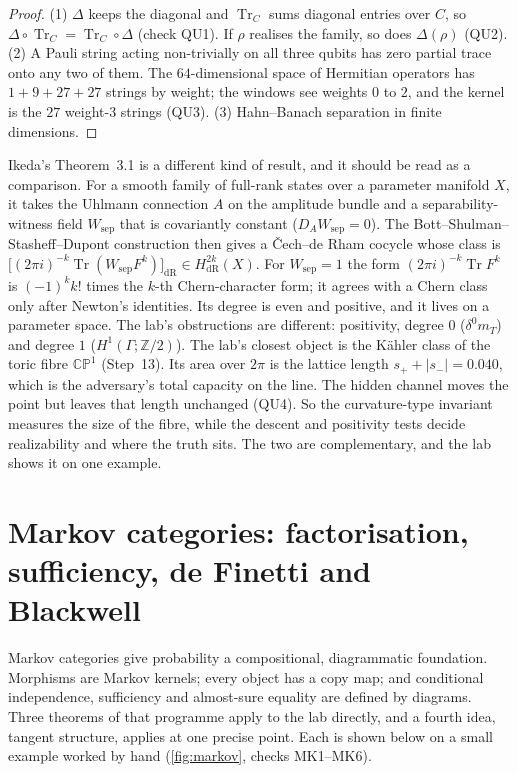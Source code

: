 \documentclass[11pt]{article}
\theoremstyle{definition}\newtheorem{definition}{Definition}\newtheorem{remark}{Remark}
\begin{document}
\begin{proof}
(1) $\Delta$ keeps the diagonal and $\operatorname{Tr}_{C}$ sums diagonal entries over $C$, so $\Delta\circ\operatorname{Tr}_C=\operatorname{Tr}_C\circ\Delta$
(check QU1). If $\rho$ realises the family, so does $\Delta(\rho)$ (QU2). (2) A Pauli string acting non-trivially on all three qubits has
zero partial trace onto any two of them. The $64$-dimensional space of Hermitian operators has $1+9+27+27$ strings by weight; the windows
see weights $0$ to $2$, and the kernel is the $27$ weight-$3$ strings (QU3). (3) Hahn--Banach separation in finite dimensions.
\end{proof}

Ikeda's Theorem~3.1 \cite{Ikeda2025} is a different kind of result, and it should be read as a comparison. For a smooth family of
full-rank states over a parameter manifold $X$, it takes the Uhlmann connection $A$ on the amplitude bundle and a separability-witness
field $W_{\mathrm{sep}}$ that is covariantly constant ($D_AW_{\mathrm{sep}}=0$). The Bott--Shulman--Stasheff--Dupont construction then
gives a Čech--de Rham cocycle whose class is $\bigl[(2\pi i)^{-k}\operatorname{Tr}(W_{\mathrm{sep}}F^k)\bigr]_{\mathrm{dR}}\in H^{2k}_{\mathrm{dR}}(X)$.
For $W_{\mathrm{sep}}=1$ the form $(2\pi i)^{-k}\operatorname{Tr}F^k$ is $(-1)^kk!$ times the $k$-th Chern-character form; it agrees with
a Chern class only after Newton's identities. Its degree is even and positive, and it lives on a parameter space. The lab's obstructions
are different: positivity, degree $0$ ($\delta^0m_T$) and degree $1$ ($H^1(\Gamma;\mathbb Z/2)$). The lab's closest object is the
Kähler class of the toric fibre $\mathbb{CP}^1$ (Step~13). Its area over $2\pi$ is the lattice length $s_++|s_-|=0.040$, which is the
adversary's total capacity on the line. The hidden channel moves the point but leaves that length unchanged (QU4). So the
curvature-type invariant measures the size of the fibre, while the descent and positivity tests decide realizability and where the truth
sits. The two are complementary, and the lab shows it on one example.

\section{Markov categories: factorisation, sufficiency, de Finetti and Blackwell}\label{sec:markov}
Markov categories \cite{Fritz2020} give probability a compositional, diagrammatic foundation. Morphisms are Markov kernels; every
object has a copy map; and conditional independence, sufficiency and almost-sure equality are defined by diagrams. Three theorems of
that programme apply to the lab directly, and a fourth idea, tangent structure, applies at one precise point. Each is shown below on a
small example worked by hand (\cref{fig:markov}, checks MK1--MK6).
\end{document}
